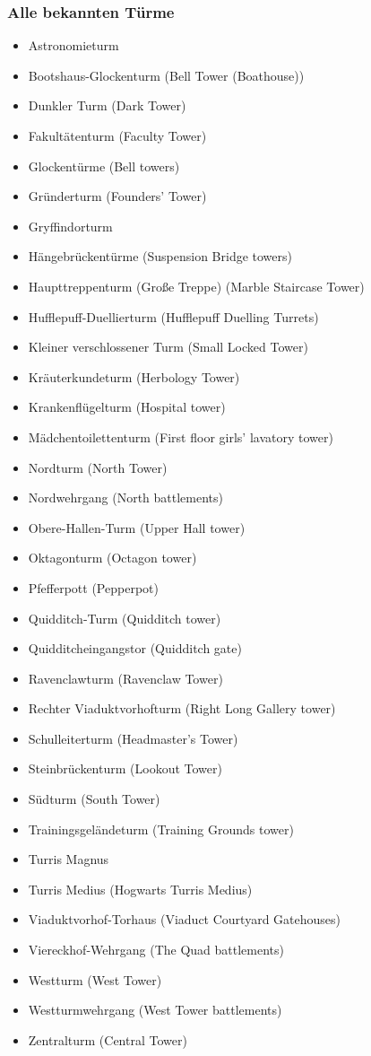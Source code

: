 \documentclass[a4paper, 10pt]{article}
\begin{document}
\subsubsection*{\large Alle bekannten Türme}
\vspace{10pt}
\begin{itemize}
    \item Astronomieturm
    \item Bootshaus-Glockenturm (Bell Tower (Boathouse))
    \item Dunkler Turm (Dark Tower)
    \item Fakultätenturm (Faculty Tower)
    \item Glockentürme (Bell towers)
    \item Gründerturm (Founders' Tower)
    \item Gryffindorturm
    \item Hängebrückentürme (Suspension Bridge towers)
    \item Haupttreppenturm (Große Treppe) (Marble Staircase Tower)
    \item Hufflepuff-Duellierturm (Hufflepuff Duelling Turrets)
    \item Kleiner verschlossener Turm (Small Locked Tower)
    \item Kräuterkundeturm (Herbology Tower)
    \item Krankenflügelturm (Hospital tower)
    \item Mädchentoilettenturm (First floor girls' lavatory tower)
    \item Nordturm (North Tower)
    \item Nordwehrgang (North battlements)
    \item Obere-Hallen-Turm (Upper Hall tower)
    \item Oktagonturm (Octagon tower)
    \item Pfefferpott (Pepperpot)
    \item Quidditch-Turm (Quidditch tower)
    \item Quidditcheingangstor (Quidditch gate)
    \item Ravenclawturm (Ravenclaw Tower)
    \item Rechter Viaduktvorhofturm (Right Long Gallery tower)
    \item Schulleiterturm (Headmaster's Tower)
    \item Steinbrückenturm (Lookout Tower)
    \item Südturm (South Tower)
    \item Trainingsgeländeturm (Training Grounds tower)
    \item Turris Magnus
    \item Turris Medius (Hogwarts Turris Medius)
    \item Viaduktvorhof-Torhaus (Viaduct Courtyard Gatehouses)
    \item Viereckhof-Wehrgang (The Quad battlements)
    \item Westturm (West Tower)
    \item Westturmwehrgang (West Tower battlements)
    \item Zentralturm (Central Tower)
\end{itemize}
\end{document}
